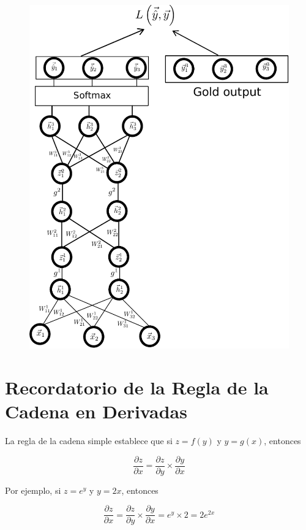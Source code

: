 \begin{figure}[htb]
	\centering
	 \includegraphics[scale=0.41]{pics/neural_net.pdf}
\end{figure}

\section{Recordatorio de la Regla de la Cadena en Derivadas}

La regla de la cadena simple establece que si $z = f(y)$ y $y = g(x)$, entonces

\begin{displaymath}
\frac{\partial z}{\partial x} = \frac{\partial z}{\partial y} \times \frac{\partial y}{\partial x}
\end{displaymath}

Por ejemplo, si $z= e^{y}$ y $y = 2x$, entonces

\begin{displaymath}
\frac{\partial z}{\partial x} = \frac{\partial z}{\partial y} \times \frac{\partial y}{\partial x} = e^{y} \times 2 = 2 e^{2x}
\end{displaymath}

